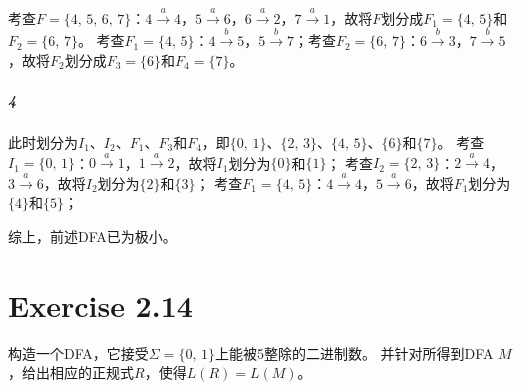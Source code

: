 \documentclass{article}
\begin{document}
考查$F=\{4,\,5,\,6,\,7\}$：$4 \xrightarrow{a} 4$，$5 \xrightarrow{a} 6$，$6  \xrightarrow{a} 2$，$7 \xrightarrow{a} 1$，故将$F$划分成$F_1=\{4,\,5\}$和$F_2=\{6,\,7\}$。
考查$F_1=\{4,\,5\}$：$4 \xrightarrow{b} 5$，$5 \xrightarrow{b} 7$；考查$F_2=\{6,\,7\}$：$6 \xrightarrow{b} 3$，$7 \xrightarrow{b} 5$，故将$F_2$划分成$F_3=\{6\}$和$F_4=\{7\}$。
\subparagraph{4}
此时划分为$I_1$、$I_2$、$F_1$、$F_3$和$F_4$，即$\{0,\,1\}$、$\{2,\,3\}$、$\{4,\,5\}$、$\{6\}$和$\{7\}$。
考查$I_1=\{0,\,1\}$：$0 \xrightarrow{a} 1$，$1 \xrightarrow{a} 2$，故将$I_1$划分为$\{0\}$和$\{1\}$；
考查$I_2=\{2,\,3\}$：$2 \xrightarrow{a} 4$，$3 \xrightarrow{a} 6$，故将$I_2$划分为$\{2\}$和$\{3\}$；
考查$F_1=\{4,\,5\}$：$4 \xrightarrow{a} 4$，$5 \xrightarrow{a} 6$，故将$F_1$划分为$\{4\}$和$\{5\}$；\par
综上，前述DFA已为极小。\\

\section{Exercise 2.14}
构造一个DFA，它接受$\Sigma=\{0,\,1\}$上能被5整除的二进制数。
并针对所得到DFA $M$，给出相应的正规式$R$，使得$L(R) = L(M)$。
\end{document}
